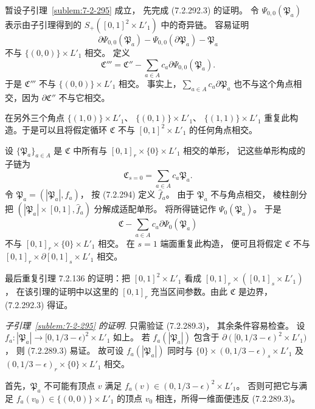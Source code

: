 暂设子引理~\ref{sublem:7-2-295} 成立，
先完成 (7.2.292.3) 的证明。
令 $\Psi_{0,0}(\mathfrak P_a)$ 表示由子引理得到的
$S_+([0,1]^2\times L'_1)$ 中的奇异链。
容易证明
\[
\partial\Psi_{0,0}(\mathfrak P_a)
-\Psi_{0,0}(\partial\mathfrak P_a)
-\mathfrak P_a
\]
不与 $\{(0,0)\}\times L'_1$ 相交。
定义
\[
\mathfrak C'''=\mathfrak C''-
\sum_{a\in A}c_a\partial\Psi_{0,0}(\mathfrak P_a).
\]
于是 $\mathfrak C'''$ 不与
$\{(0,0)\}\times L'_1$ 相交。
事实上，$\sum_{a\in A}c_a\partial\mathfrak P_a$
也不与这个角点相交，因为
$\partial\mathfrak C''$ 不与它相交。

在另外三个角点
$\{(1,0)\}\times L'_1$、
$\{(0,1)\}\times L'_1$、
$\{(1,1)\}\times L'_1$
重复此构造。于是可以且将假定循环
$\mathfrak C$ 不与 $[0,1]^2\times L'_1$
的任何角点相交。

设 $\{\mathfrak P_a\}_{a\in A}$ 是
$\mathfrak C$ 中所有与
$[0,1]_r\times\{0\}\times L'_1$ 相交的单形，
记这些单形构成的子链为
\[
\mathfrak C_{s=0}
=\sum_{a\in A}c_a\mathfrak P_a.
\]
令 $\mathfrak P_a=(|\mathfrak P_a|,f_a)$，
按 (7.2.294) 定义 $\widehat f_a$。
由于 $\mathfrak P_a$ 不与角点相交，
棱柱剖分把
$(|\mathfrak P_a|\times[0,1],\widehat f_a)$
分解成适配单形。
将所得链记作 $\Psi_0(\mathfrak P_a)$。
于是
\[
\mathfrak C-
\sum_{a\in A}c_a\partial\Psi_0(\mathfrak P_a)
\]
不与 $[0,1]_r\times\{0\}\times L'_1$ 相交。
在 $s=1$ 端面重复此构造，
便可且将假定 $\mathfrak C$ 不与
$[0,1]_r\times\partial[0,1]_s\times L'_1$
相交。

最后重复引理 7.2.136 的证明：把
$[0,1]^2\times L'_1$ 看成
$[0,1]_r\times([0,1]_s\times L'_1)$，
在该引理的证明中以这里的 $[0,1]_r$
充当区间参数。由此 $\mathfrak C$ 是边界，
(7.2.292.3) 得证。

\par\noindent\textit{子引理~\ref{sublem:7-2-295} 的证明.}\quad
只需验证 (7.2.289.3)，
其余条件容易检查。
设 $f_a\colon|\mathfrak P_a|\to
[0,1/3-\epsilon)^2\times L'_1$ 如上。
若 $f_a(|\mathfrak P_a|)$ 包含于
$\partial([0,1/3-\epsilon)^2\times L'_1)$，
则 (7.2.289.3) 易证。
故可设 $f_a(|\mathfrak P_a|)$ 同时与
$\{0\}\times(0,1/3-\epsilon)_s\times L'_1$
及 $(0,1/3-\epsilon)_r\times\{0\}\times L'_1$
相交。

首先，$\mathfrak P_a$ 不可能有顶点 $v$ 满足
$f_a(v)\in(0,1/3-\epsilon)^2\times L'_1$。
否则可把它与满足
$f_a(v_0)\in\{(0,0)\}\times L'_1$
的顶点 $v_0$ 相连，所得一维面便违反
(7.2.289.3)。

